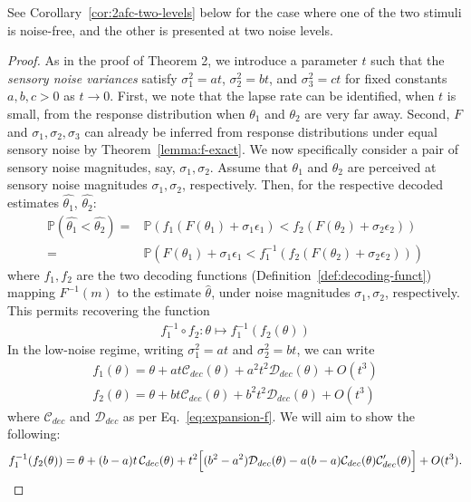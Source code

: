 \documentclass[si.tex]{subfiles}
\begin{document}
See Corollary~\ref{cor:2afc-two-levels} below for the case where one of the two stimuli is noise-free, and the other is presented at two noise levels.

\begin{proof}
As in the proof of Theorem 2, we introduce a parameter \(t\) such that the \emph{sensory noise variances} satisfy \(\sigma_1^2=at\), \(\sigma_2^2=bt\), and \(\sigma_3^2=ct\) for fixed constants \(a,b,c>0\) as \(t\rightarrow 0\).
First, we note that the lapse rate can be identified, when $t$ is small, from the response distribution when $\theta_1$ and $\theta_2$ are very far away. 
Second, $F$ and $\sigma_1, \sigma_2, \sigma_3$ can already be inferred from response distributions under equal sensory noise by Theorem~\ref{lemma:f-exact}.
We now specifically consider a pair of sensory noise magnitudes, say, $\sigma_1, \sigma_2$.
Assume that $\theta_1$ and $\theta_2$ are perceived at sensory noise magnitudes $\sigma_1, \sigma_2$, respectively.
Then, for the respective decoded estimates $\widehat{\theta_1}$, $\widehat{\theta_2}$:
\begin{align*}
    \mathbb{P}(\widehat{\theta_1} < \widehat{\theta_2}) =& \mathbb{P}\left(f_1(F(\theta_1)+\sigma_1 \epsilon_1) < f_2(F(\theta_2)+\sigma_2 \epsilon_2)\right) \\
    =& \mathbb{P}\left(F(\theta_1)+\sigma_1 \epsilon_1 < f_1^{-1}(f_2(F(\theta_2)+\sigma_2 \epsilon_2))\right) 
\end{align*}
where $f_1, f_2$ are the two decoding functions (Definition~\ref{def:decoding-funct}) mapping $F^{-1}(m)$ to the estimate $\widehat{\theta}$, under noise magnitudes $\sigma_1, \sigma_2$, respectively.
This permits recovering the function
\begin{align*}
    f_1^{-1} \circ f_2 : \theta \mapsto f_1^{-1}(f_2(\theta))
\end{align*}
In the low-noise regime, writing $\sigma_1^2 = at$ and $\sigma_2^2 = bt$, we can write
\begin{align*}
    f_1(\theta) = \theta + at\mathcal{C}_{dec}(\theta)+ a^2t^2 \mathcal{D}_{dec}(\theta) + O(t^3) \\
    f_2(\theta) = \theta + bt\mathcal{C}_{dec}(\theta)+ b^2t^2 \mathcal{D}_{dec}(\theta) + O(t^3) 
\end{align*}
where $\mathcal{C}_{dec}$ and $\mathcal{D}_{dec}$ as per Eq.~\ref{eq:expansion-f}. 
We will aim to show the following:
\begin{equation}\label{eq:f1-f2-composed}
f_1^{-1}(f_2(\theta)) = \theta + (b-a)t\,\mathcal{C}_{dec}(\theta) + t^2\Bigl[(b^2-a^2)\mathcal{D}_{dec}(\theta)-a(b-a)\mathcal{C}_{dec}(\theta)\mathcal{C}_{dec}'(\theta)\Bigr] + O(t^3).

\end{equation}
\end{proof}
\end{document}
